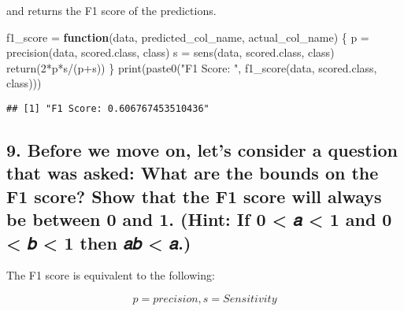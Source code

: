 \documentclass[
]{article}
\newenvironment{Shaded}{\begin{snugshade}}{\end{snugshade}}
\newcommand{\ControlFlowTok}[1]{\textcolor[rgb]{0.13,0.29,0.53}{\textbf{#1}}}
\newcommand{\DecValTok}[1]{\textcolor[rgb]{0.00,0.00,0.81}{#1}}
\newcommand{\FunctionTok}[1]{\textcolor[rgb]{0.00,0.00,0.00}{#1}}
\newcommand{\NormalTok}[1]{#1}
\newcommand{\OtherTok}[1]{\textcolor[rgb]{0.56,0.35,0.01}{#1}}
\newcommand{\SpecialCharTok}[1]{\textcolor[rgb]{0.00,0.00,0.00}{#1}}
\newcommand{\StringTok}[1]{\textcolor[rgb]{0.31,0.60,0.02}{#1}}
\begin{document}
and returns the F1 score of the predictions.

\begin{Shaded}
\begin{Highlighting}[]
\NormalTok{f1\_score }\OtherTok{=} \ControlFlowTok{function}\NormalTok{(data, predicted\_col\_name, actual\_col\_name) \{}
\NormalTok{  p }\OtherTok{=} \FunctionTok{precision}\NormalTok{(data, }\StringTok{\textquotesingle{}scored.class\textquotesingle{}}\NormalTok{, }\StringTok{\textquotesingle{}class\textquotesingle{}}\NormalTok{) }
\NormalTok{  s }\OtherTok{=} \FunctionTok{sens}\NormalTok{(data, }\StringTok{\textquotesingle{}scored.class\textquotesingle{}}\NormalTok{, }\StringTok{\textquotesingle{}class\textquotesingle{}}\NormalTok{)}
  \FunctionTok{return}\NormalTok{(}\DecValTok{2}\SpecialCharTok{*}\NormalTok{p}\SpecialCharTok{*}\NormalTok{s}\SpecialCharTok{/}\NormalTok{(p}\SpecialCharTok{+}\NormalTok{s))}
\NormalTok{\} }
\FunctionTok{print}\NormalTok{(}\FunctionTok{paste0}\NormalTok{(}\StringTok{"F1 Score: "}\NormalTok{, }\FunctionTok{f1\_score}\NormalTok{(data, }\StringTok{\textquotesingle{}scored.class\textquotesingle{}}\NormalTok{, }\StringTok{\textquotesingle{}class\textquotesingle{}}\NormalTok{)))}
\end{Highlighting}
\end{Shaded}

\begin{verbatim}
## [1] "F1 Score: 0.606767453510436"
\end{verbatim}

\hypertarget{before-we-move-on-lets-consider-a-question-that-was-asked-what-are-the-bounds-on-the-f1-score-show-that-the-f1-score-will-always-be-between-0-and-1.-hint-if-0-ux1d44e-1-and-0-ux1d44f-1-then-ux1d44eux1d44f-ux1d44e.}{%
\subsection{9. Before we move on, let's consider a question that was
asked: What are the bounds on the F1 score? Show that the F1 score will
always be between 0 and 1. (Hint: If 0 \textless{} 𝑎 \textless{} 1 and 0
\textless{} 𝑏 \textless{} 1 then 𝑎𝑏 \textless{}
𝑎.)}\label{before-we-move-on-lets-consider-a-question-that-was-asked-what-are-the-bounds-on-the-f1-score-show-that-the-f1-score-will-always-be-between-0-and-1.-hint-if-0-ux1d44e-1-and-0-ux1d44f-1-then-ux1d44eux1d44f-ux1d44e.}}

The F1 score is equivalent to the following:

\[
p = precision, s = Sensitivity
\]
\end{document}
